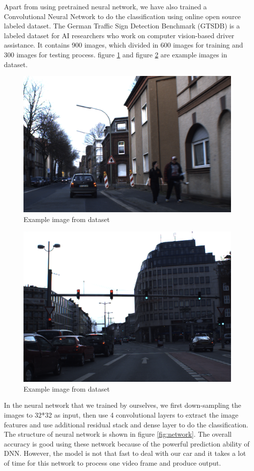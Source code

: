 \documentclass[11pt, titlepage]{article} %
\begin{document}
Apart from using pretrained neural network, we have also trained a Convolutional Neural Network to do the classification using online open source labeled dataset. The German Traffic Sign Detection Benchmark (GTSDB) is a labeled dataset for AI researchers who work on computer vision-based driver assistance. It contains 900 images, which divided in 600 images for training and 300 images for testing process. figure \ref{fig:GTSDB1} and figure \ref{fig:GTSDB2} are example images in dataset.
\begin{figure}[]
	\centering
   	\includegraphics[scale=0.4]{GTSDB1.jpg}
   	\caption{Example image from dataset}
   	\label{fig:GTSDB1}
\end{figure}

\begin{figure}[]
	\centering
   	\includegraphics[scale=0.3]{GTSDB2.png}
   	\caption{Example image from dataset}
   	\label{fig:GTSDB2}
\end{figure}
In the neural network that we trained by ourselves, we first down-sampling the images to 32*32 as input, then use 4 convolutional layers to extract the image features and use additional residual stack and dense layer to do the classification. The structure of neural network is shown in figure \ref{fig:network}. The overall accuracy is good using these network because of the powerful prediction ability of DNN. However, the model is not that fast to deal with our car and it takes a lot of time for this network to process one video frame and produce output. 
\end{document}
